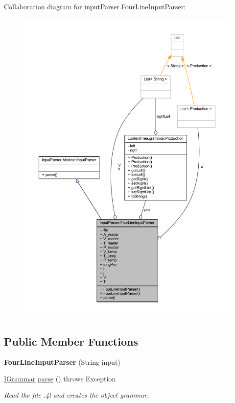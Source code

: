 Collaboration diagram for input\-Parser.\-Four\-Line\-Input\-Parser\-:
\nopagebreak
\begin{figure}[H]
\begin{center}
\leavevmode
\includegraphics[width=350pt]{classinput_parser_1_1_four_line_input_parser__coll__graph}
\end{center}
\end{figure}
\subsection*{Public Member Functions}
\begin{DoxyCompactItemize}
\item 
\hypertarget{classinput_parser_1_1_four_line_input_parser_ab60c07b777f5edc493d0d71abcfdc840}{{\bfseries Four\-Line\-Input\-Parser} (String input)}\label{classinput_parser_1_1_four_line_input_parser_ab60c07b777f5edc493d0d71abcfdc840}

\item 
\hyperlink{interfacecontext_free_1_1grammar_1_1_i_grammar}{I\-Grammar} \hyperlink{classinput_parser_1_1_four_line_input_parser_a99c37488d66cfeecb33e13d573b4a81a}{parse} ()  throws Exception
\begin{DoxyCompactList}\small\item\em Read the file .4l and creates the object grammar. \end{DoxyCompactList}\end{DoxyCompactItemize}
